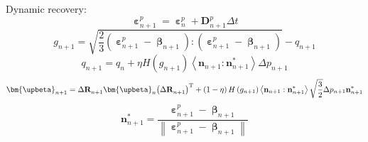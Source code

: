 Dynamic recovery:
\begin{equation}
{\bm{\upepsilon }}_{n + 1}^p = {\bm{\upepsilon }}_{n}^p + {\mathbf{D}}_{n + 1}^p\Delta t
\end{equation}
\begin{equation}
{g_{n + 1}} = \sqrt {\frac{2}{3}\left( { {\bm{\upepsilon }}_{n + 1}^p - {{\bm{\upbeta }}_{n + 1}}} \right):\left( { {\bm{\upepsilon }}_{n + 1}^p - {{\bm{\upbeta }}_{n + 1}}} \right)}  - {q_{n + 1}}
\end{equation}
\begin{equation}
{q_{n + 1}} = {q_{n}} + \eta H\left( {{g_{n + 1}}} \right)\left\langle {{{\mathbf{n}}_{n + 1}}:{\mathbf{n}}_{n + 1}^*} \right\rangle \Delta {p_{n + 1}}
\end{equation}
\begin{equation}
{{\bm{\upbeta }}_{n + 1}} = \Delta {\mathbf{R}}_{n + 1}^{}{{\bm{\upbeta }}_n}{\left( {\Delta {\mathbf{R}}_{n + 1}^{}} \right)^{\rm{T}}} +
\left( {1 - \eta } \right)H\left( {{g_{n + 1}}} \right)\left\langle {{{\mathbf{n}}_{n + 1}}:{\mathbf{n}}_{n + 1}^*} \right\rangle \sqrt {\frac{3}{2}} \Delta {p_{n + 1}}{\mathbf{n}}_{n + 1}^*
\end{equation}
\begin{equation}
{\mathbf{n}}_{n + 1}^* = \frac{{{\bm{\upepsilon }}_{n + 1}^p - {{\bm{\upbeta }}_{n + 1}}}}{{\left\| {{\bm{\upepsilon }}_{n + 1}^p - {{\bm{\upbeta }}_{n + 1}}} \right\|}}
\end{equation}




